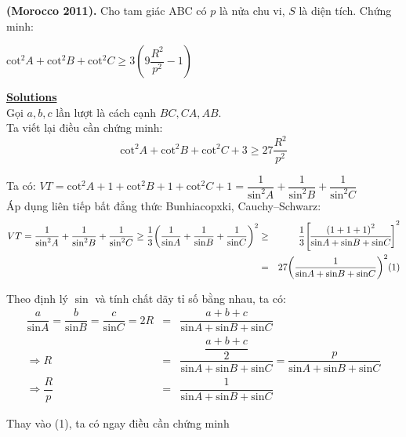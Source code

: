 \documentclass[12pt,a4paper]{article}
\begin{document}
	\textbf{(Morocco 2011).} Cho tam giác ABC có $p$ là nửa chu vi, $S$ là diện tích. Chứng minh:
\begin{center}
	${\mathrm{cot}}^{2}A+{\mathrm{cot}}^{2}B+{\mathrm{cot}}^{2}C\ge 3\left(9\dfrac{{R}^{2}}{{p}^{2}}-1\right)$
\end{center}

\textbf{\underline{Solutions}}\\

Gọi $a,b,c$ lần lượt là cách cạnh $BC,CA,AB$.\\

Ta viết lại điều cần chứng minh:
\[{\mathrm{cot}}^{2}A+{\mathrm{cot}}^{2}B+{\mathrm{cot}}^{2}C+3\ge 27\dfrac{{R}^{2}}{{p}^{2}}\]


Ta có: $VT={\mathrm{cot}}^{2}A+1+{\mathrm{cot}}^{2}B+1+{\mathrm{cot}}^{2}C+1=\dfrac{1}{{\mathrm{sin}}^{2}A}+\dfrac{1}{{\mathrm{sin}}^{2}B}+\dfrac{1}{{\mathrm{sin}}^{2}C}$\\


Áp dụng liên tiếp bất đẳng thức Bunhiacopxki, Cauchy–Schwarz:
\begin{eqnarray*}
VT=\dfrac{1}{{\mathrm{sin}}^{2}A}+\dfrac{1}{{\mathrm{sin}}^{2}B}+\dfrac{1}{{\mathrm{sin}}^{2}C}\ge\dfrac{1}{3}{\left(\dfrac{1}{\mathrm{sin}A}+\dfrac{1}{\mathrm{sin}B}+\dfrac{1}{\mathrm{sin}C}\right)}^{2}&\ge&\dfrac{1}{3}\bigg{[\dfrac{{\left(1+1+1\right)}^{2}}{\mathrm{sin}A+\mathrm{sin}B+\mathrm{sin}C}\bigg]}^{2}\\
&=&27{\left(\dfrac{1}{\mathrm{sin}A+\mathrm{sin}B+\mathrm{sin}C}\right)}^{2} {(1)}
\end{eqnarray*}

Theo định lý $\sin$ và tính chất dãy tỉ số bằng nhau, ta có:
\begin{eqnarray*}
\dfrac{a}{\mathrm{sin}A}=\dfrac{b}{\mathrm{sin}B}=\dfrac{c}{\mathrm{sin}C}=2R&=&\dfrac{a+b+c}{\mathrm{sin}A+\mathrm{sin}B+\mathrm{sin}C}\\
\Rightarrow{R}&=&\dfrac{\dfrac{a+b+c}{2}}{\mathrm{sin}A+\mathrm{sin}B+\mathrm{sin}C}=\dfrac{p}{\mathrm{sin}A+\mathrm{sin}B+\mathrm{sin}C}\\
\Rightarrow\dfrac{R}{p}&=&\dfrac{1}{\mathrm{sin}A+\mathrm{sin}B+\mathrm{sin}C}
\end{eqnarray*}

Thay vào (1), ta có ngay điều cần chứng minh
\end{document}
